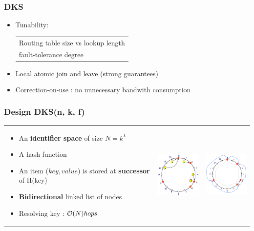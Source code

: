\subsubsection{DKS}

\begin{itemize}
    \item Tunability: \begin{tabular}{l}
            Routing table size vs lookup length\\
            fault-tolerance degree
        \end{tabular}
    \item Local atomic join and leave (strong guarantees)
    \item Correction-on-use : no unnecessary bandwith consumption
\end{itemize}

\subsubsection{Design DKS(n, k, f)}
\begin{tabular}{m{10cm}m{3cm}m{3cm}}
\begin{itemize}
    \item An \textbf{identifier space} of size $N=k^L$
    \item A hash function
    \item An item ($key, value$) is stored at \textbf{successor} of
        H(key)
    \item \textbf{Bidirectional} linked list of nodes
    \item Resolving key : $\mathcal{O}(N) hops$
\end{itemize}
& \includegraphics[width=3cm]{img/dks1.png}
& \includegraphics[width=3cm]{img/dks2.png} \\
\end{tabular}


